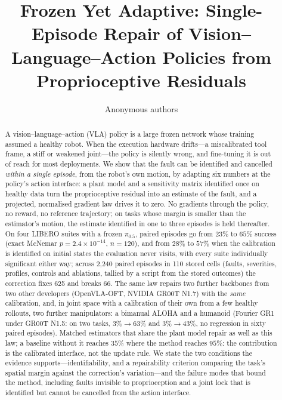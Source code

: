\documentclass{article}
\title{Frozen Yet Adaptive: Single-Episode Repair of Vision--Language--Action Policies from Proprioceptive Residuals}
\author{Anonymous authors}
\begin{document}
\maketitle

\begin{abstract}
A vision--language--action (VLA) policy is a large frozen network whose training assumed a
healthy robot. When the execution hardware drifts---a miscalibrated tool frame, a stiff or
weakened joint---the policy is silently wrong, and fine-tuning it is out of reach for most
deployments. We show that the fault can be identified and cancelled \emph{within a single
episode}, from the robot's own motion, by adapting six numbers at the policy's action
interface: a plant model and a sensitivity matrix identified once on healthy data turn the
proprioceptive residual into an estimate of the fault, and a projected, normalised gradient
law drives it to zero. No gradients through the policy, no reward, no reference trajectory;
on tasks whose margin is smaller than the estimator's motion, the estimate identified in one
to three episodes is held thereafter. On four LIBERO suites with a frozen $\pi_{0.5}$, paired
episodes go from $23\%$ to $65\%$ success (exact McNemar $p = 2.4\times10^{-14}$, $n=120$), and
from $28\%$ to $57\%$ when the calibration is identified on initial states the evaluation never
visits, with every suite individually significant either way; across 2,240 paired episodes in 110 stored cells
(faults, severities, profiles, controls and ablations, tallied by a script from the stored
outcomes) the correction fixes 625 and breaks 66. The same law repairs two further backbones from two other developers (OpenVLA-OFT,
NVIDIA GR00T N1.7) with the \emph{same} calibration, and, in joint space with a calibration
of their own from a few healthy rollouts, two further manipulators: a bimanual ALOHA and a
humanoid (Fourier GR1 under GR00T N1.5: on two tasks, $3\%\to63\%$ and $3\%\to43\%$, no
regression in sixty paired episodes). Matched estimators that share the plant model repair
as well as this law; a baseline without it reaches $35\%$ where the method reaches $95\%$:
the contribution is the calibrated interface, not the update rule. We state the
two conditions the evidence supports---identifiability, and a repairability criterion
comparing the task's spatial margin against the correction's variation---and the failure
modes that bound the method, including faults invisible to proprioception and a joint lock
that is identified but cannot be cancelled from the action interface.
\end{abstract}
\end{document}
